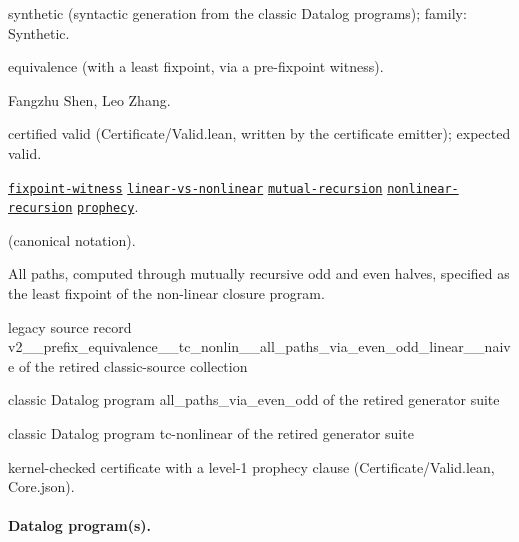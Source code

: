 \documentclass[10pt]{article}
\begin{document}
\begin{description}[leftmargin=2.6cm,style=nextline,itemsep=1pt]

\item[Category] synthetic (syntactic generation from the classic Datalog programs); family: Synthetic.

\item[Kind] equivalence (with a least fixpoint, via a pre-fixpoint witness).

\item[Contributors] Fangzhu Shen, Leo Zhang.

\item[Status] certified valid (Certificate/Valid.lean, written by the certificate emitter); expected valid.

\item[Tags] \hyperref[tag:fixpoint-witness]{\texttt{fixpoint-witness}} \hyperref[tag:linear-vs-nonlinear]{\texttt{linear-vs-nonlinear}} \hyperref[tag:mutual-recursion]{\texttt{mutual-recursion}} \hyperref[tag:nonlinear-recursion]{\texttt{nonlinear-recursion}} \hyperref[tag:prophecy]{\texttt{prophecy}}.

\item[Input]  (canonical notation).

\item[Summary] All paths, computed through mutually recursive odd and even halves, specified as the least fixpoint of the non-linear closure program.

\item[Sources] {\raggedright legacy source record v2\_\_prefix\_equivalence\_\_tc\_nonlin\_\_all\_paths\_via\_even\_odd\_linear\_\_naive of the retired classic-source collection \par classic Datalog program all\_paths\_via\_even\_odd of the retired generator suite \par classic Datalog program tc-nonlinear of the retired generator suite\par}

\item[Prophecy] kernel-checked certificate with a level-1 prophecy clause (Certificate/Valid.lean, Core.json).

\end{description}

\paragraph{Datalog program(s).}
\end{document}
